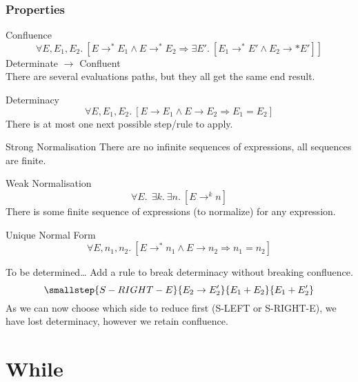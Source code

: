 \subsubsection{Properties}
\begin{definitionbox}{Confluence}
    \[\forall E, E_1, E_2 . \ [E \to^* E_1 \land E \to^* E_2 \Rightarrow \exists E' . \ [E_1 \to^* E' \land E_2 \to* E']]\]
    Determinate $\rightarrow$ Confluent
    \\ There are several evaluations paths, but they all get the same end result.
\end{definitionbox}
\begin{tcbraster}[raster columns=2,raster equal height]
    \begin{definitionbox}{Determinacy}
        \[\forall E, E_1, E_2 . \ [E \to E_1 \land E \to E_2 \Rightarrow E_1 = E_2]\]
        There is at most one next possible step/rule to apply.
    \end{definitionbox}
    \begin{definitionbox}{Strong Normalisation}
        There are no infinite sequences of expressions, all sequences are finite.
    \end{definitionbox}

    \begin{definitionbox}{Weak Normalisation}
        \[\forall E. \ \ \exists k. \ \exists n. \ [E \to^k n]\]
        There is some finite sequence of expressions (to normalize) for any expression.
    \end{definitionbox}
    \begin{definitionbox}{Unique Normal Form}
        \[\forall E, n_1, n_2. \ [E \to^* n_1 \land E \to n_2 \Rightarrow n_1 = n_2]\]
    \end{definitionbox}
\end{tcbraster}	

\begin{examplebox}{To be determined\dots}
    Add a rule to break determinacy without breaking confluence.
    \tcblower
    \[\smallstep{S-RIGHT-E}{E_2 \to E_2'}{E_1 + E_2}{E_1 + E_2'}\]
    As we can now choose which side to reduce first (S-LEFT or S-RIGHT-E), we have lost determinacy, however we retain confluence.
\end{examplebox}

\section{While}
